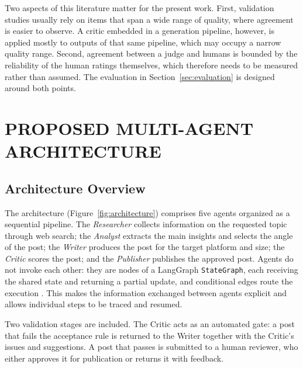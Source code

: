 \documentclass[a4paper,twoside]{article}
\begin{document}
Two aspects of this literature matter for the present work. First, validation studies usually rely on items that span a wide range of quality, where agreement is easier to observe. A critic embedded in a generation pipeline, however, is applied mostly to outputs of that same pipeline, which may occupy a narrow quality range. Second, agreement between a judge and humans is bounded by the reliability of the human ratings themselves, which therefore needs to be measured rather than assumed. The evaluation in Section~\ref{sec:evaluation} is designed around both points.

\section{\uppercase{Proposed Multi-Agent Architecture}}
\label{sec:architecture}

\subsection{Architecture Overview}

The architecture (Figure~\ref{fig:architecture}) comprises five agents organized as a sequential pipeline. The \emph{Researcher} collects information on the requested topic through web search; the \emph{Analyst} extracts the main insights and selects the angle of the post; the \emph{Writer} produces the post for the target platform and size; the \emph{Critic} scores the post; and the \emph{Publisher} publishes the approved post. Agents do not invoke each other: they are nodes of a LangGraph \texttt{StateGraph}, each receiving the shared state and returning a partial update, and conditional edges route the execution \cite{langgraph}. This makes the information exchanged between agents explicit and allows individual steps to be traced and resumed.

Two validation stages are included. The Critic acts as an automated gate: a post that fails the acceptance rule is returned to the Writer together with the Critic's issues and suggestions. A post that passes is submitted to a human reviewer, who either approves it for publication or returns it with feedback.
\end{document}
